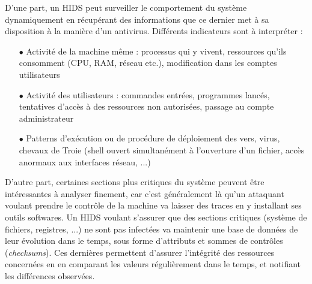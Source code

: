 \documentclass[]{article}
\begin{document}
\par D'une part, un HIDS peut surveiller le comportement du système  dynamiquement en récupérant des informations que ce dernier met à sa disposition à la manière d'un antivirus. Différents indicateurs sont à interpréter :
\vspace{0.2cm}
\begin{itemize}
\item[$\bullet$] Activité de la machine même : processus qui y vivent, ressources qu'ils consomment (CPU, RAM, réseau etc.), modification dans les comptes utilisateurs
\vspace{0.2cm}
\item[$\bullet$] Activité des utilisateurs : commandes entrées, programmes lancés, tentatives d'accès à des ressources non autorisées, passage au compte administrateur
\vspace{0.2cm}
\item[$\bullet$] Patterns d'exécution ou de procédure de déploiement des vers, virus, chevaux de Troie (shell ouvert simultanément à l'ouverture d'un fichier, accès anormaux aux interfaces réseau, ...)
\end{itemize}
\vspace{0.4cm}
\par D'autre part, certaines sections plus critiques du système peuvent être intéressantes à analyser finement, car c'est généralement là qu'un attaquant voulant prendre le contrôle de la machine va laisser des traces en y installant ses outils softwares. Un HIDS voulant s'assurer que des sections critiques (système de fichiers, registres, ...) ne sont pas infectées va maintenir une base de données de leur évolution dans le temps, sous forme d'attributs et sommes de contrôles (\textit{checksums}). Ces dernières permettent d'assurer l'intégrité des ressources concernées en en comparant les valeurs régulièrement dans le temps, et notifiant les différences observées.

~\\
\end{document}
